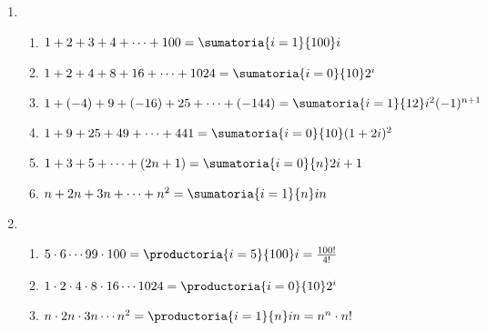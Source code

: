 \begin{enumerate}[label=\roman*)]
  \item
        \begin{enumerate}[label=\alph*)]
          \item  $
                  1 + 2 + 3 + 4 + \dots + 100 =
                  \sumatoria{i=1}{100}i
                $
          \item\label{referenciaAlItem:1-2}
                $
                  1 + 2 + 4 + 8 + 16 + \dots + 1024 =
                  \sumatoria{i=0}{10}2^i
                $

          \item  $
                  1 + (-4) + 9 + (-16) + 25 + \dots + (-144) =
                  \sumatoria{i=1}{12}i^2(-1)^{n+1}
                $

          \item $
                  1 + 9 + 25 + 49 + \dots + 441 =
                  \sumatoria{i=0}{10}(1+2i)^2
                $

          \item $
                  1 + 3 + 5 + \dots + (2n + 1) =
                \sumatoria{i=0}{n} 2i+1
                $

          \item $
                  n + 2n + 3n + \dots + n^2 =
                  \sumatoria{i=1}{n} in
                $
        \end{enumerate}

  \item \begin{enumerate}[label=\alph*)]
          \item $5 \cdot 6 \cdots 99 \cdot 100 =
                  \productoria{i=5}{100}i = \frac{100!}{4!}
                $

          \item $
                  1 \cdot 2 \cdot 4 \cdot 8 \cdot 16 \cdots 1024 =
                  \productoria{i=0}{10}2^i
                $

          \item $
                  n \cdot 2n \cdot 3n \cdots n^2 =
                  \productoria{i=1}{n}in = n^n \cdot n!
                $
        \end{enumerate}
\end{enumerate}
